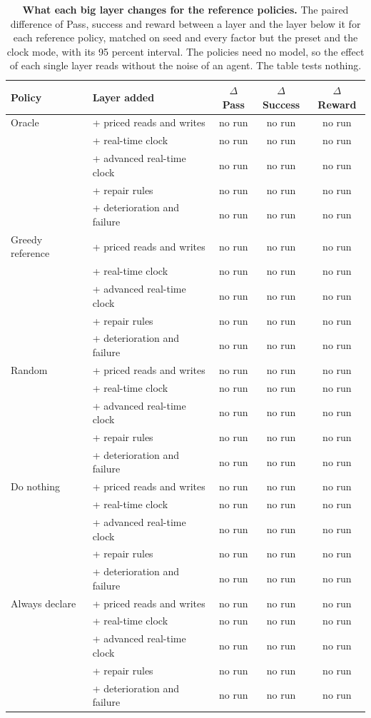 \documentclass[10pt]{article}
\begin{document}
\vspace{-8pt}
\begin{table}[H]\centering\footnotesize
\caption{\textbf{What each big layer changes for the reference policies.} The paired difference of Pass, success and reward between a layer and the layer below it for each reference policy, matched on seed and every factor but the preset and the clock mode, with its 95 percent interval. The policies need no model, so the effect of each single layer reads without the noise of an agent. The table tests nothing.}
\label{tab:policylayers}
\setlength{\tabcolsep}{3pt}
\begin{tabular}{llccc}
\toprule
Policy & Layer added & $\Delta$Pass & $\Delta$Success & $\Delta$Reward \\
\midrule
Oracle & + priced reads and writes & no run & no run & no run \\
 & + real-time clock & no run & no run & no run \\
 & + advanced real-time clock & no run & no run & no run \\
 & + repair rules & no run & no run & no run \\
 & + deterioration and failure & no run & no run & no run \\
\midrule
Greedy reference & + priced reads and writes & no run & no run & no run \\
 & + real-time clock & no run & no run & no run \\
 & + advanced real-time clock & no run & no run & no run \\
 & + repair rules & no run & no run & no run \\
 & + deterioration and failure & no run & no run & no run \\
\midrule
Random & + priced reads and writes & no run & no run & no run \\
 & + real-time clock & no run & no run & no run \\
 & + advanced real-time clock & no run & no run & no run \\
 & + repair rules & no run & no run & no run \\
 & + deterioration and failure & no run & no run & no run \\
\midrule
Do nothing & + priced reads and writes & no run & no run & no run \\
 & + real-time clock & no run & no run & no run \\
 & + advanced real-time clock & no run & no run & no run \\
 & + repair rules & no run & no run & no run \\
 & + deterioration and failure & no run & no run & no run \\
\midrule
Always declare & + priced reads and writes & no run & no run & no run \\
 & + real-time clock & no run & no run & no run \\
 & + advanced real-time clock & no run & no run & no run \\
 & + repair rules & no run & no run & no run \\
 & + deterioration and failure & no run & no run & no run \\
\bottomrule
\end{tabular}
\end{table}
\end{document}
